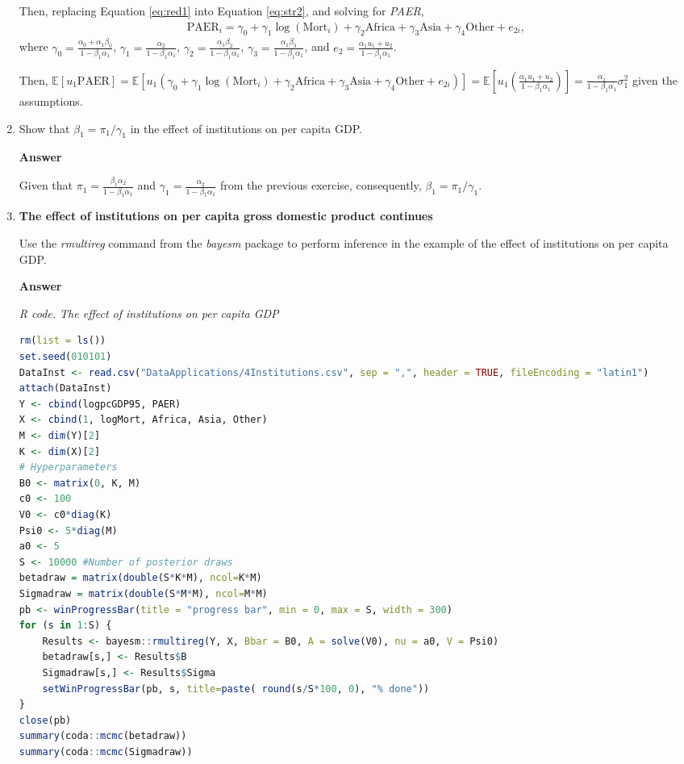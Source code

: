 \begin{enumerate}[leftmargin=*]
Then, replacing Equation \ref{eq:red1} into Equation \ref{eq:str2}, and solving for \textit{PAER},
\begin{align}\label{eq:red2}
	\text{PAER}_i=\gamma_0+\gamma_1\log(\text{Mort}_i)+\gamma_2 \text{Africa}+\gamma_3 \text{Asia}+\gamma_4 \text{Other}+e_{2i},
\end{align}
where $\gamma_0=\frac{\alpha_0+\alpha_1\beta_0}{1-\beta_1\alpha_1}$, $\gamma_1=\frac{\alpha_2}{1-\beta_1\alpha_1}$, $\gamma_2=\frac{\alpha_1\beta_2}{1-\beta_1\alpha_1}$, $\gamma_3=\frac{\alpha_1\beta_3}{1-\beta_1\alpha_1}$, and $e_2=\frac{\alpha_1u_1+u_2}{1-\beta_1\alpha_1}$.

Then, $\mathbb{E}[u_1\text{PAER}]=\mathbb{E}\left[u_1(\gamma_0+\gamma_1\log(\text{Mort}_i)+\gamma_2 \text{Africa}+\gamma_3 \text{Asia}+\gamma_4 \text{Other}+e_{2i})\right]=\mathbb{E}\left[u_1\left(\frac{\alpha_1u_1+u_2}{1-\beta_1\alpha_1}\right)\right]=\frac{\alpha_1}{1-\beta_1\alpha_1}\sigma^2_1$ given the assumptions.      

\item Show that $\beta_1=\pi_1/\gamma_1$ in the effect of institutions on per capita GDP.

\textbf{Answer}

Given that $\pi_1=\frac{\beta_1\alpha_2}{1-\beta_1\alpha_1}$ and $\gamma_1=\frac{\alpha_2}{1-\beta_1\alpha_1}$ from the previous exercise, consequently, $\beta_1=\pi_1/\gamma_1$.

\item \textbf{The effect of institutions on per capita gross domestic product continues}

Use the \textit{rmultireg} command from the \textit{bayesm} package to perform inference in the example of the effect of institutions on per capita GDP.

\textbf{Answer}

\begin{tcolorbox}[enhanced,width=4.67in,center upper,
	fontupper=\large\bfseries,drop shadow southwest,sharp corners]
	\textit{R code. The effect of institutions on per capita GDP}
	\begin{VF}
		\begin{lstlisting}[language=R]
rm(list = ls())
set.seed(010101)
DataInst <- read.csv("DataApplications/4Institutions.csv", sep = ",", header = TRUE, fileEncoding = "latin1")
attach(DataInst)
Y <- cbind(logpcGDP95, PAER)
X <- cbind(1, logMort, Africa, Asia, Other)
M <- dim(Y)[2]
K <- dim(X)[2]
# Hyperparameters
B0 <- matrix(0, K, M)
c0 <- 100
V0 <- c0*diag(K)
Psi0 <- 5*diag(M)
a0 <- 5
S <- 10000 #Number of posterior draws
betadraw = matrix(double(S*K*M), ncol=K*M)
Sigmadraw = matrix(double(S*M*M), ncol=M*M)
pb <- winProgressBar(title = "progress bar", min = 0, max = S, width = 300)
for (s in 1:S) {
	Results <- bayesm::rmultireg(Y, X, Bbar = B0, A = solve(V0), nu = a0, V = Psi0)
	betadraw[s,] <- Results$B
	Sigmadraw[s,] <- Results$Sigma
	setWinProgressBar(pb, s, title=paste( round(s/S*100, 0), "% done"))
}
close(pb)
summary(coda::mcmc(betadraw))
summary(coda::mcmc(Sigmadraw))
\end{lstlisting}
	\end{VF}
\end{tcolorbox} 
 

\end{enumerate}
